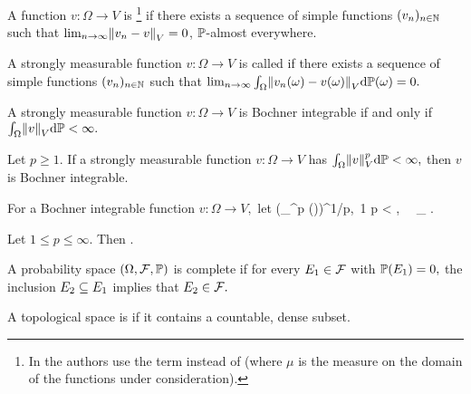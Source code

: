 \label{def:strongmeas}
A function $v:\Omega \rightarrow V$ is 
\footnote{In \cite{DiUh:77} the authors use the term  instead of  (where $\mu$ is the measure on the domain of the functions under consideration).} 
if there exists a sequence of simple functions $(v_{n})_{n \in \mathbb N}$ such that
$\lim_{n \rightarrow \infty} \NV{\vn - v} = 0$, %
$\mathbb P$-almost everywhere.
\ede



A strongly measurable function $v:\Omega \rightarrow V$ is called  if there exists a sequence of simple functions $(v_{n})_{n \in \mathbb N}$ such that
$\lim_{n \rightarrow \infty} \int_{\Omega} \NV{\vn(\omega) - v(\omega)} \dd\PP(\omega) = 0.$
\ede

\label{thm:bochnercond}
A strongly measurable function $v:\Omega \rightarrow V$ is Bochner integrable if and only if $\int_\Omega \NV{v} \dd\PP < \infty.$
\enth

\label{cor:bochnersimple}
Let $p \geq 1.$ If a strongly measurable function $v:\Omega \rightarrow V$ has $\int_\Omega \NV{v}^p \dd\PP < \infty,$ then $v$ is Bochner integrable.
\eco



\label{def:bochnernorm}
For a Bochner integrable function $v:\Omega\rightarrow V,$ let
\beqs
{} \de \mleft(\int_\Omega {}^p \dd\PP(\omega)\mright)^{1/p}, \,1 \leq p < \infty, \,\,\,\, \de \esssup_{\omega \in \Omega} .
\eeqs
\ede

\label{def:bochnerspace}
Let $1\leq p \leq \infty.$ Then
\beqs
\LpOV \de {}.
\eeqs
\ede

A probability space $\OFP$ is complete if for every $E_{1} \in \mathcal F$ with $\mathbb P(E_{1})=0,$ the inclusion $E_{2} \subseteq E_{1}$ implies that $E_{2} \in \mathcal F.$
\ede

A topological space is  if it contains a countable, dense subset.
\ede

